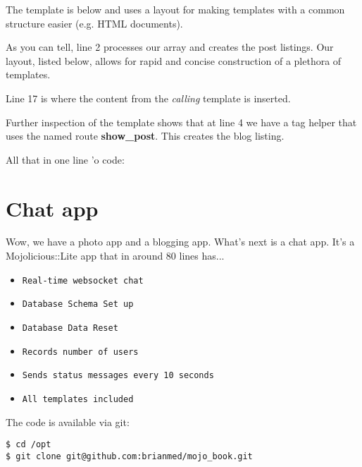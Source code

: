 \documentclass[14pt]{extreport}
\begin{document}


The template is below and uses a layout for making templates with a common
structure easier (e.g. HTML documents).



As you can tell, line 2 processes our array and creates the post listings.  Our
layout, listed below, allows for rapid and concise construction of a plethora
of templates.

\clearpage



Line 17 is where the content from the \textit{calling} template is inserted.

Further inspection of the template shows that at line 4 we have a tag helper that
uses the named route \textbf{show\_post}.  This creates the blog listing.

All that in one line 'o code:



\section{Chat app}

Wow, we have a photo app and a blogging app.  What's next is a chat app.  It's
a Mojolicious::Lite app that in around 80 lines has...

\begin{itemize} \itemsep1pt \parskip0pt 
\item \verb|Real-time websocket chat|
\item \verb|Database Schema Set up|
\item \verb|Database Data Reset|
\item \verb|Records number of users|
\item \verb|Sends status messages every 10 seconds|
\item \verb|All templates included|
\end{itemize}

The code is available via git:

\begin{lstlisting}[style=BashOutputStyle]
$ cd /opt
$ git clone git@github.com:brianmed/mojo_book.git
\end{lstlisting}
\end{document}
